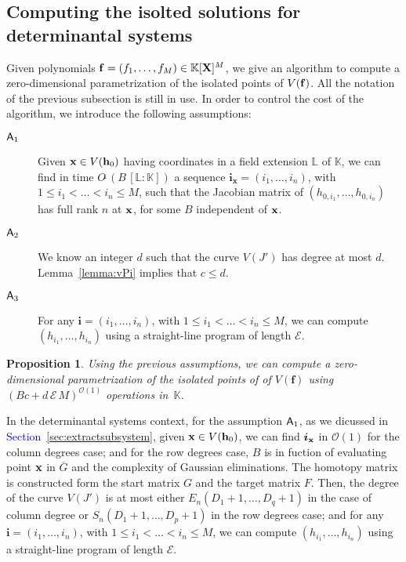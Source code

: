 \documentclass[11pt]{article}
\numberwithin{Property}{section}
\numberwithin{Theorem}{section}
\newtheorem{Proposition}{Proposition}%
\numberwithin{Proposition}{section}
\numberwithin{Lemma}{section}
\numberwithin{Corollary}{section}
\numberwithin{Definition}{section}
\numberwithin{Remark}{section}
\numberwithin{Conjecture}{section}
\numberwithin{Problem}{section}
\numberwithin{Claim}{section}
\theoremstyle{definition}
\numberwithin{Example}{section}
\def\f {\ensuremath{\mathbf{f}}}
\def\h {\ensuremath{\mathbf{h}}}
\renewcommand{\le}{\leqslant}
\renewcommand{\ge}{\geqslant}
\def\bar{\overline}
\newcommand{\bigO}[1]{\mathcal{O}(#1)} %
\renewcommand{\ge}{\geqslant} %
\renewcommand{\le}{\leqslant} %
\newcommand{\field}{\mathbb{K}} %
\newcommand{\mat}[1]{\mathbf{\MakeUppercase{#1}}} %
\newcommand{\improve}[1]{\textcolor{blue}{#1}} %
\begin{document}
\subsection{Computing the isolted solutions for determinantal systems}
Given polynomials ${\bf{f}} = (f_1, \ldots, f_M) \in \field[\mat{X}]^M$, we give an algorithm to compute a zero-dimensional parametrization of the isolated points of $V(\bf{f})$. All the notation of the previous subsection is still in use. In order to control the cost of the algorithm, we introduce the following assumptions:
\begin{description}
\item[${\sf A}_1$] Given ${\bf x} \in V(\h_0)$ having coordinates in a field extension $\mathbb{L}$ of $\field$, we can find in time $O\tilde{~}(B\, [\mathbb{L} : \field])$ a sequence ${\bm i}_{\mathbf{x}}= (i_1,\dots,i_n)$, with $1 \le i_1 < \dots < i_n \le M$, such that the Jacobian matrix of $(h_{0,i_1},\dots,h_{0,{i_n}})$ has full rank $n$ at ${\bf x}$, for some $B$ independent of ${\bf x}$.
\item[${\sf A}_2$] We know an integer $d$ such that the curve $V(J')$ has degree at most $d$. Lemma~\ref{lemma:vPi} implies that  $c \le d$.
\item[${\sf A}_3$] For any ${\bm i}=(i_1,\dots,i_n)$, with $1 \le i_1 <
  \dots < i_n \le M$, we can compute $(h_{i_1},\dots,h_{{i_n}})$ using
  a straight-line program of length $\mathcal{E}$.
\end{description}

\begin{Proposition}\label{compute_isolated}
  Using the previous assumptions, we can compute a zero-dimensional
  parametrization of the isolated points of 
 of $V(\f)$ using $(B c + d\,\mathcal{E}\,M)^{\mathcal{O}(1)}$ operations in~$\field$.
\end{Proposition}

In the determinantal systems context, for the assumption ${\sf A}_1$, as we dicussed in \improve{Section~\ref{sec:extractsubsystem}}, given ${\bf x} \in V(\h_0)$, we can find ${\bm i}_{\bf x}$ in $\bigO{1}$ for the column degrees case; and for the row degrees case, $B$ is in fuction of evaluating point ${\bf x}$ in $\bar{G}$ and the complexity of Gaussian eliminations. The homotopy matrix is constructed form the start matrix $G$ and the target matrix $F$. Then, the degree of the curve  $V(J')$ is at most either $E_{n}(D_1 + 1, \ldots, D_q+1)$ in the case of column degree or $S_{n}(D_1+1, \ldots, D_p+1)$ in the row degrees case; and for any ${\bm i}=(i_1,\dots,i_n)$, with $1 \le i_1 < \dots < i_n \le M$, we can compute $(h_{i_1},\dots,h_{{i_n}})$ using
  a straight-line program of length $\mathcal{E}$. 
\end{document}
